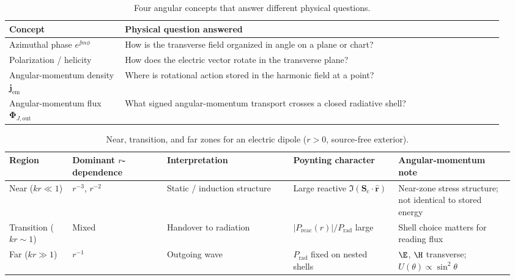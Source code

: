\begin{table}[t]
\centering
\caption{Four angular concepts that answer different physical questions.}
\label{tab:ch1.four-not-confused}
\small
\begin{tabular}{@{}p{0.22\linewidth}p{0.72\linewidth}@{}}
\toprule
Concept & Physical question answered \\
\midrule
Azimuthal phase $e^{\jj m\phi}$
& How is the transverse field organized in angle on a plane or chart? \\
Polarization / helicity
& How does the electric vector rotate in the transverse plane? \\
Angular-momentum density $\mathbf{j}_{\mathrm{em}}$
& Where is rotational action stored in the harmonic field at a point? \\
Angular-momentum flux $\boldsymbol{\Phi}_{J,\mathrm{out}}$
& What signed angular-momentum transport crosses a closed radiative shell? \\
\bottomrule
\end{tabular}
\end{table}

\begin{table}[t]
\centering
\caption{Near, transition, and far zones for an electric dipole ($r>0$, source-free exterior).}
\label{tab:ch1.near-far-zones}
\small
\begin{tabular}{@{}p{0.12\linewidth}p{0.18\linewidth}p{0.24\linewidth}p{0.20\linewidth}p{0.22\linewidth}@{}}
\toprule
Region & Dominant $r$-dependence & Interpretation & Poynting character & Angular-momentum note \\
\midrule
Near ($kr\ll1$) & $r^{-3}$, $r^{-2}$ & Static / induction structure & Large reactive $\Im(\mathbf{S}_\mathrm{c}\cdot\hat{\mathbf{r}})$ & Near-zone stress structure; not identical to stored energy \\
Transition ($kr\sim1$) & Mixed & Handover to radiation & $|P_{\mathrm{reac}}(r)|/P_{\mathrm{rad}}$ large & Shell choice matters for reading flux \\
Far ($kr\gg1$) & $r^{-1}$ & Outgoing wave & $P_{\mathrm{rad}}$ fixed on nested shells & $\E$, $\H$ transverse; $U(\theta)\propto\sin^2\theta$ \\
\bottomrule
\end{tabular}
\end{table}
